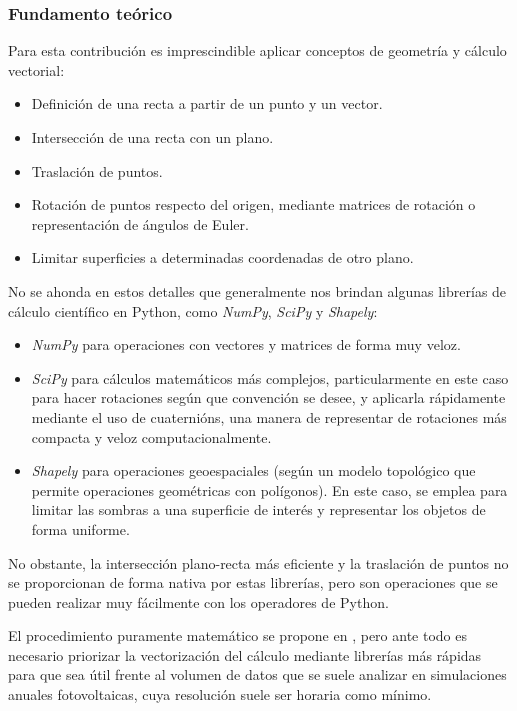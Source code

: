 \subsubsection{Fundamento teórico}

Para esta contribución es imprescindible aplicar conceptos de geometría y cálculo vectorial:

\begin{itemize}
    \item Definición de una recta a partir de un punto y un vector.
    \item Intersección de una recta con un plano.
    \item Traslación de puntos.
    \item Rotación de puntos respecto del origen, mediante matrices de rotación o representación de ángulos de Euler.
    \item Limitar superficies a determinadas coordenadas de otro plano.
\end{itemize}

No se ahonda en estos detalles que generalmente nos brindan algunas librerías de cálculo científico en Python, como \textit{NumPy}, \textit{SciPy} y \textit{Shapely}:

\begin{itemize}
    \item \textit{NumPy} para operaciones con vectores y matrices de forma muy veloz.
    \item \textit{SciPy} para cálculos matemáticos más complejos, particularmente en este caso para hacer rotaciones según que convención se desee, y aplicarla rápidamente mediante el uso de \glspl{cuaternión}, una manera de representar de rotaciones más compacta y veloz computacionalmente.
    \item \textit{Shapely} para operaciones geoespaciales (según un modelo topológico que permite operaciones geométricas con polígonos). En este caso, se emplea para limitar las sombras a una superficie de interés y representar los objetos de forma uniforme.
\end{itemize}

No obstante, la intersección plano-recta más eficiente y la traslación de puntos no se proporcionan de forma nativa por estas librerías, pero son operaciones que se pueden realizar muy fácilmente con los operadores de Python.

El procedimiento puramente matemático se propone en \cite{Zainali_Ma_Lu_Stridh_Avelin_Amaducci_Colauzzi_Campana_2023}, pero ante todo es necesario priorizar la vectorización del cálculo mediante librerías más rápidas para que sea útil frente al volumen de datos que se suele analizar en simulaciones anuales fotovoltaicas, cuya resolución suele ser horaria como mínimo.

